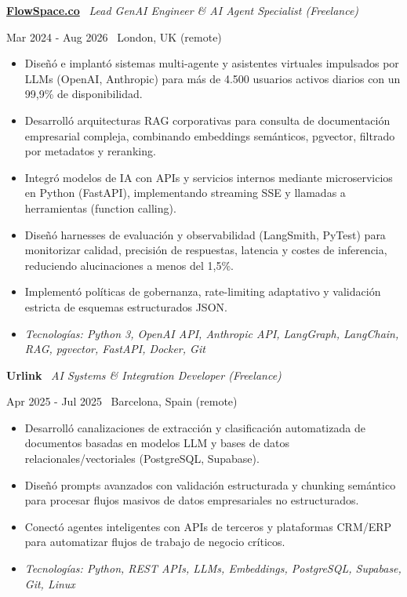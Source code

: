 \documentclass[a4paper,10pt]{article}
\newcommand{\role}[4]{%
  \vspace{2pt}\noindent
  \begin{minipage}[t]{0.70\textwidth}\raggedright\textbf{#1} \textbullet\ \textit{#3}\end{minipage}%
  \hfill
  \begin{minipage}[t]{0.28\textwidth}\raggedleft\footnotesize\color{gray}#2 \textbullet\ #4\end{minipage}%
  \vspace{1pt}%
}
\begin{document}
\role{\href{https://flowspace.co}{FlowSpace.co}}{Mar 2024 - Aug 2026}{Lead GenAI Engineer \& AI Agent Specialist (Freelance)}{London, UK (remote)}
\begin{itemize}
  \item Diseñó e implantó sistemas multi-agente y asistentes virtuales impulsados por LLMs (OpenAI, Anthropic) para más de 4.500 usuarios activos diarios con un 99,9\% de disponibilidad.
  \item Desarrolló arquitecturas RAG corporativas para consulta de documentación empresarial compleja, combinando embeddings semánticos, pgvector, filtrado por metadatos y reranking.
  \item Integró modelos de IA con APIs y servicios internos mediante microservicios en Python (FastAPI), implementando streaming SSE y llamadas a herramientas (function calling).
  \item Diseñó harnesses de evaluación y observabilidad (LangSmith, PyTest) para monitorizar calidad, precisión de respuestas, latencia y costes de inferencia, reduciendo alucinaciones a menos del 1,5\%.
  \item Implementó políticas de gobernanza, rate-limiting adaptativo y validación estricta de esquemas estructurados JSON.
  \item \textit{Tecnologías: Python 3, OpenAI API, Anthropic API, LangGraph, LangChain, RAG, pgvector, FastAPI, Docker, Git}
\end{itemize}

\role{Urlink}{Apr 2025 - Jul 2025}{AI Systems \& Integration Developer (Freelance)}{Barcelona, Spain (remote)}
\begin{itemize}
  \item Desarrolló canalizaciones de extracción y clasificación automatizada de documentos basadas en modelos LLM y bases de datos relacionales/vectoriales (PostgreSQL, Supabase).
  \item Diseñó prompts avanzados con validación estructurada y chunking semántico para procesar flujos masivos de datos empresariales no estructurados.
  \item Conectó agentes inteligentes con APIs de terceros y plataformas CRM/ERP para automatizar flujos de trabajo de negocio críticos.
  \item \textit{Tecnologías: Python, REST APIs, LLMs, Embeddings, PostgreSQL, Supabase, Git, Linux}
\end{itemize}
\end{document}
